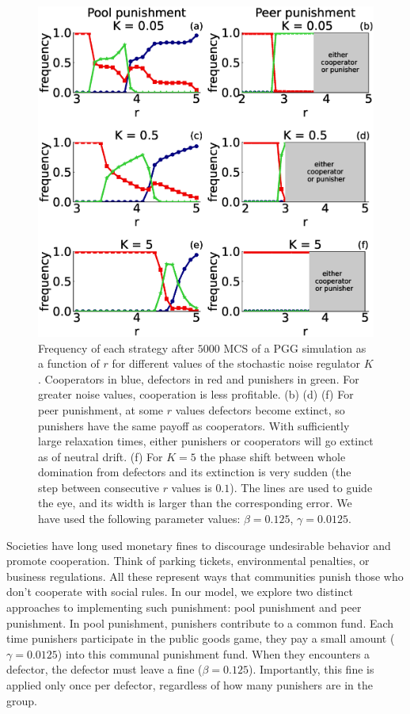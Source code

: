 \begin{figure}
	\centering
	\includegraphics[width=1\linewidth]{Images/P2/densidadVSr_L300t5000variosK.eps}
	\caption{Frequency of each strategy after $5000$ MCS of a PGG simulation as a function of $r$ for different values of the stochastic noise regulator $K$. Cooperators in blue, defectors in red and punishers in green. For greater noise values, cooperation is less profitable. (b) (d) (f) For peer punishment, at some $r$ values defectors become extinct, so  punishers have the same payoff as cooperators. With sufficiently large relaxation times, either punishers or cooperators will go extinct as of neutral drift. (f) For $K=5$ the phase shift between whole domination from defectors and its extinction is very sudden (the step between consecutive $r$ values is $0.1$). The lines are used to guide the eye, and its width is larger than the corresponding error. We have used the following parameter values: $\beta=0.125$, $\gamma=0.0125$.}
	\label{densidad}
\end{figure}




Societies have long used monetary fines to discourage undesirable behavior and promote cooperation. Think of parking tickets, environmental penalties, or business regulations. All these represent ways that communities punish those who don't cooperate with social rules. In our model, we explore two distinct approaches to implementing such punishment: pool punishment and peer punishment. 
In pool punishment, punishers contribute to a common fund. Each time punishers participate in the public goods game, they pay a small amount ($\gamma=0.0125$) into this communal punishment fund. When they encounters a defector, the defector must leave a fine ($\beta=0.125$). Importantly, this fine is applied only once per defector, regardless of how many punishers are in the group.

